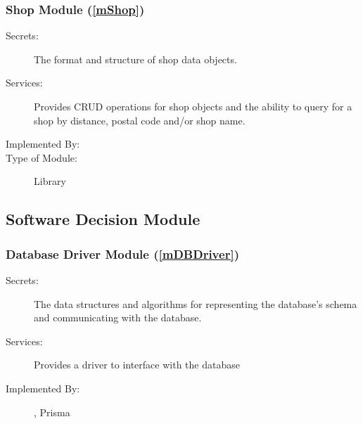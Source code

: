 \documentclass[12pt, titlepage]{article}
\begin{document}
\subsubsection{Shop Module (\ref{mShop})}

\begin{description}
	\item[Secrets:] The format and structure of shop data objects.
	\item[Services:] Provides CRUD operations for shop objects and the ability to query for a shop by
		distance, postal code and/or shop name.
	\item[Implemented By:] \progname{}
	\item[Type of Module:] Library
\end{description}

\subsection{Software Decision Module}


\subsubsection{Database Driver Module (\ref{mDBDriver})}
\begin{description}
	\item[Secrets:] The data structures and algorithms for representing the database's schema and
		communicating with the database.
	\item[Services:] Provides a driver to interface with the database
	\item[Implemented By:] \progname{}, Prisma
\end{description}
\end{document}
